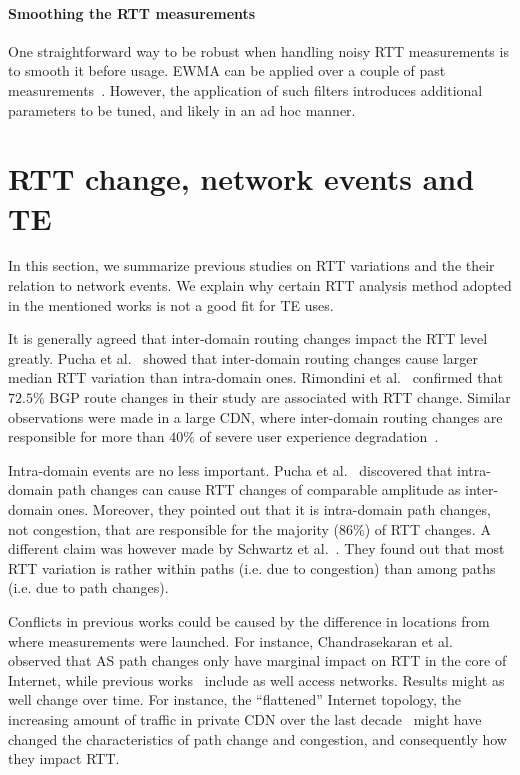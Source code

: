 \paragraph{Smoothing the RTT measurements} One straightforward way to be robust when handling noisy RTT measurements is to smooth it before usage. 
\ac{EWMA} can be applied over a couple of past measurements~\cite{Akella2008}. However, the application of such filters introduces additional parameters to be tuned, and likely in an ad hoc manner. 


\section{RTT change, network events and TE}
\label{sec:rtt_path}
In this section, we summarize previous studies on RTT variations and the  their relation to network events.
We explain why certain RTT analysis method adopted in the mentioned works is not a good fit for TE uses.

It is generally agreed that inter-domain routing changes impact the RTT level greatly.
Pucha et al.~\cite{Pucha2007} showed that inter-domain routing changes cause larger median RTT variation than intra-domain ones.
Rimondini et al.~\cite{Rimondini2014} confirmed that $72.5\%$ BGP route changes in their study are associated with RTT change.
Similar observations were made in a large \ac{CDN}, where inter-domain routing changes are responsible for more than $40\%$ of severe user experience degradation~\cite{Zhu2012}.

Intra-domain events are no less important. Pucha et al.~\cite{Pucha2007} discovered that intra-domain path changes can cause RTT changes of comparable amplitude as inter-domain ones.
Moreover, they pointed out that it is intra-domain path changes, not congestion, that are responsible for the majority ($86\%$) of RTT changes. %
A different claim was however made by Schwartz et al.~\cite{Schwartz2010}. They found out that most RTT variation is rather within paths (i.e. due to congestion) than among paths (i.e. due to path changes).

Conflicts in previous works could be caused by the difference in locations from where measurements were launched.
For instance, Chandrasekaran et al.~\cite{Chandrasekaran} observed that AS path changes only have marginal impact on RTT in the core of Internet, while previous works~\cite{Pucha2007, Schwartz2010} include as well access networks.
Results might as well change over time. For instance, the ``flattened'' Internet topology, the increasing amount of traffic in private CDN over the last decade~\cite{Labovitz2011, Roughan2011} might have changed the characteristics of path change and congestion, and consequently how they impact RTT.

